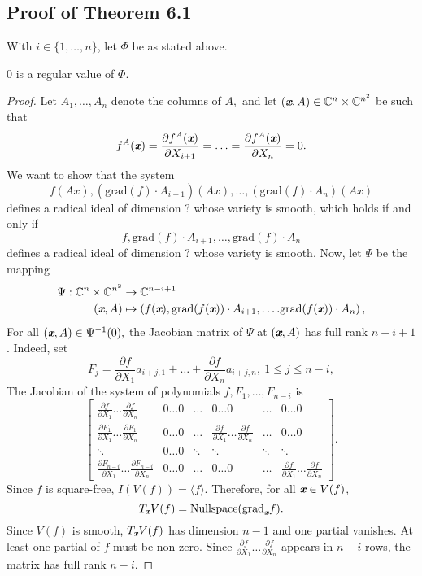 \documentclass[sigconf]{acmart}
\def\xb{\textit{\textbf{x}}}
\def\C{\mathbb{C}}
\def\grad{\textrm{grad}}
\def\pa{\partial}
\begin{document}
\subsection{Proof of Theorem 6.1}
With $i \in \{1,\hdots,n\}$, let $\Phi$ be as stated above.
%
\begin{proposition} 
0 is a regular value of $\Phi$.
\end{proposition}
%
\begin{proof}
Let $A_1,\hdots,A_n$ denote the columns of $A,$ and let $(\xb,A) \in \C^n \times \C^{n^2}$ be such that \[
f^A(\xb) = \frac{\partial f^A(\xb)}{\partial X_{i+1}}=\hdots= \frac{\partial f^A(\xb)}{\partial X_n}=0.
\] 
We want to show that the system
\[
f(Ax),(\grad(f)\cdot 
A_{i+1})(Ax),\hdots, 
(\grad(f)\cdot 
A_n)(Ax)
\]
defines a radical ideal of dimension ? whose variety is smooth, which holds if and only if 
\[
f,\grad(f)\cdot 
A_{i+1},\hdots, 
\grad(f)\cdot 
A_n
\]
defines a radical ideal of dimension ? whose variety is smooth. Now, let $\Psi$ be the mapping
%
\begin{align*}
    \Psi: \C^n \times \C^{n^2} &\rightarrow \C^{n-i+1} \\
       (\xb,A) &\mapsto 
       \left(f(\xb),\grad(f(\xb))\cdot 
A_{i+1},\hdots. 
\grad(f(\xb))\cdot 
A_{n}
\right),
\end{align*}
%
For all $(\xb,A) \in \Psi^{-1}(0),$ the Jacobian matrix of $\Psi$ at $(\xb,A)$ has full rank $n-i+1$. Indeed, set 
\[
F_j = \frac{\pa f}{\pa X_1} a_{i+j,1} + \hdots + \frac{\pa f}{\pa X_n}a_{i+j,n}, ~1 \leq j \leq n-i,
\]
The Jacobian of the system of polynomials $f,F_{1},\hdots,F_{n-i}$ is
\[
\left[ 
\begin{array}{cccccc}
\frac{\pa f}{\pa X_1} \hdots \frac{\pa f}{\pa X_n}            &0\hdots 0&\hdots& 0 \hdots 0                                         & \hdots & 0\hdots 0 \\ 
\frac{\pa F_{1}}{\pa X_1}\hdots \frac{\pa F_{1}}{\pa X_n}     &0\hdots 0&\hdots& \frac{\pa f}{\pa X_1} \hdots \frac{\pa f}{\pa X_n} & \hdots & 0\hdots 0 \\
\ddots                                                        &0\hdots 0&\ddots&\ddots                                              & \ddots & \ddots \\
\frac{\pa F_{n-i}}{\pa X_1}\hdots \frac{\pa F_{n-i}}{\pa X_n} &0\hdots 0&\hdots&0 \hdots 0&  \hdots & \frac{\pa f}{\pa X_1} \hdots \frac{\pa f}{\pa X_n}  
\end{array}
\right]. 
\] 
Since $f$ is square-free, $I(V(f)) = \langle f \rangle.$ Therefore, for all $\xb \in V(f)$, 
\[
T_{\xb} V(f) = \textrm{Nullspace}(\grad_{\xb} f).
\]
Since $V(f)$ is smooth, $T_{\xb} V(f)$ has dimension $n-1$ and one partial vanishes. At least one partial of $f$ must be non-zero. Since  $\frac{\pa f}{\pa X_1} \hdots \frac{\pa f}{\pa X_n}$ appears in $n-i$ rows, the matrix has full rank $n-i$.
\end{proof}
\end{document}
